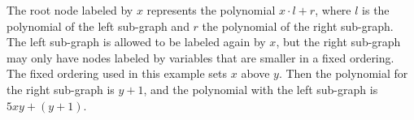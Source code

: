 The root node labeled by $x$ represents the polynomial $x\cdot l + r$, 
where $l$ is the polynomial of the left sub-graph and $r$ the polynomial
of the right sub-graph. The left sub-graph is allowed to be labeled again by $x$, 
but the right sub-graph may only have nodes labeled by variables that are smaller
in a fixed ordering. The fixed ordering used in this example sets $x$ above $y$.
Then the polynomial for the right sub-graph is $y + 1$, and the polynomial with the
left sub-graph is $5xy + (y + 1)$.

